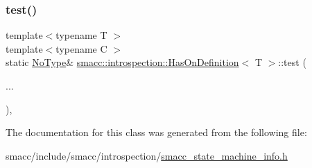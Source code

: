\subsubsection{\texorpdfstring{test()}{test()}\hspace{0.1cm}{\footnotesize\ttfamily [2/2]}}
{\footnotesize\ttfamily template$<$typename T $>$ \\
template$<$typename C $>$ \\
static \hyperlink{classsmacc_1_1introspection_1_1HasOnDefinition_ab6416d52a925d6a0ce9204897191692e}{No\+Type}\& \hyperlink{classsmacc_1_1introspection_1_1HasOnDefinition}{smacc\+::introspection\+::\+Has\+On\+Definition}$<$ T $>$\+::test (\begin{DoxyParamCaption}\item[{}]{... }\end{DoxyParamCaption})\hspace{0.3cm}{\ttfamily [static]}, {\ttfamily [private]}}



The documentation for this class was generated from the following file\+:\begin{DoxyCompactItemize}
\item 
smacc/include/smacc/introspection/\hyperlink{smacc__state__machine__info_8h}{smacc\+\_\+state\+\_\+machine\+\_\+info.\+h}\end{DoxyCompactItemize}
